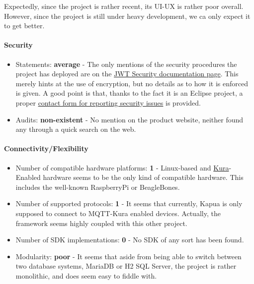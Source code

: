 \documentclass{article}
\begin{document}
Expectedly, since the project is rather recent, its UI-UX is rather poor overall. However, since the project is still under heavy development, we ca only expect it to get better.

\paragraph{Security}

\begin{itemize}
\item Statements: \textbf{average} - The only mentions of the security procedures the project has deployed are on the \href{http://download.eclipse.org/kapua/docs/develop/user-manual/en/jwt_security.html}{JWT Security documentation page}. This merely hints at the use of encryption, but no details as to how it is enforced is given. A good point is that, thanks to the fact it is an Eclipse project, a proper \href{https://github.com/eclipse/kapua/issues}{contact form for reporting security issues} is provided.
\item Audits: \textbf{non-existent} - No mention on the product website, neither found any through a quick search on the web.
\end{itemize}

\paragraph{Connectivity/Flexibility}

\begin{itemize}
\item Number of compatible hardware platforms: \textbf{1} - Linux-based and \href{https://www.eclipse.org/kura/}{Kura}-Enabled hardware seems to be the only kind of compatible hardware. This includes the well-known RaspberryPi or BeagleBones.
\item Number of supported protocols: \textbf{1} - It seems that currently, Kapua is only supposed to connect to MQTT-Kura enabled devices. Actually, the framework seems highly coupled with this other project.
\item Number of SDK implementations: \textbf{0} - No SDK of any sort has been found.
\item Modularity: \textbf{poor} - It seems that aside from being able to switch between two database systems, MariaDB or H2 SQL Server, the project is rather monolithic, and does seem easy to fiddle with.
\end{itemize}
\end{document}
